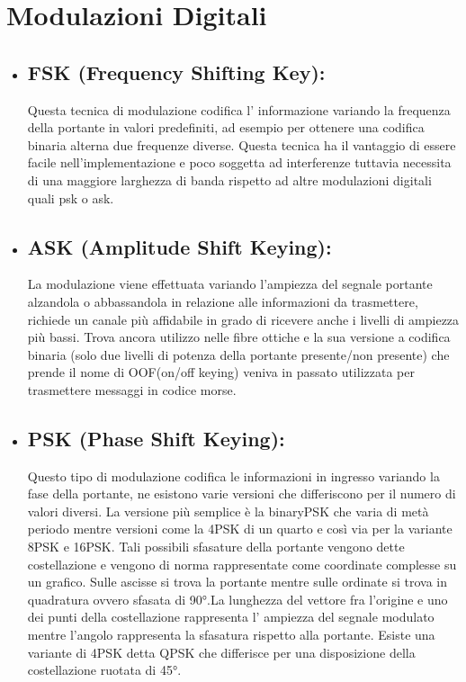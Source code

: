 \section{Modulazioni Digitali}
\label{sec:context}
\begin{itemize}
  \item \subsection{FSK (Frequency Shifting Key): } Questa tecnica di modulazione codifica l' informazione variando la frequenza della portante in valori predefiniti, ad esempio per ottenere una codifica binaria alterna due frequenze diverse. Questa tecnica ha il vantaggio di essere facile nell'implementazione e poco soggetta ad interferenze tuttavia necessita di una maggiore larghezza di banda rispetto ad altre modulazioni digitali quali psk o ask.
  \cite{fsk}
  \item \subsection{ASK (Amplitude Shift Keying): } La modulazione viene effettuata variando l'ampiezza del segnale portante alzandola o abbassandola in relazione alle informazioni da trasmettere, richiede un canale più affidabile in grado di ricevere anche i livelli di ampiezza più bassi. Trova ancora utilizzo nelle fibre ottiche e la sua versione a codifica binaria (solo due livelli di potenza della portante presente/non presente) che prende il nome di OOF(on/off keying) veniva in passato utilizzata per trasmettere messaggi in codice morse.
  \cite{ask}
  \item \subsection{PSK (Phase Shift Keying): } Questo tipo di modulazione codifica le informazioni in ingresso variando la fase della portante, ne esistono varie versioni che differiscono per il numero di valori diversi. La versione più semplice è la binaryPSK che varia di metà periodo mentre versioni come la 4PSK di un quarto e così via per la variante 8PSK e 16PSK. Tali possibili sfasature della portante vengono dette costellazione e vengono di norma rappresentate come coordinate complesse su un grafico. Sulle ascisse si trova la portante mentre sulle ordinate si trova in quadratura ovvero sfasata di 90°.La lunghezza del vettore fra l'origine e uno dei punti della costellazione rappresenta l' ampiezza del segnale modulato mentre l'angolo rappresenta la sfasatura rispetto alla portante. Esiste una variante di 4PSK detta QPSK che differisce per una disposizione della costellazione ruotata di 45°.

\end{itemize}
